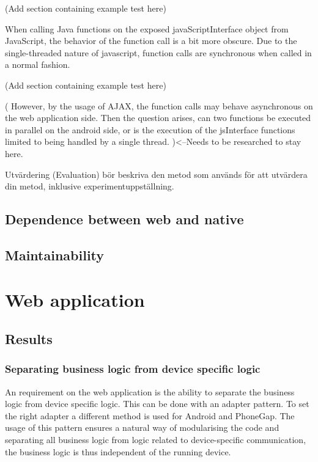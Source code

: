 (Add section containing example test here)

When calling Java functions on the exposed javaScriptInterface object from JavaScript, the behavior of the function call is a bit more obscure. Due to the single-threaded nature of javascript, function calls are synchronous when called in a normal fashion.

(Add section containing example test here)

( However, by the usage of AJAX, the function calls may behave asynchronous on the web application side. Then the question arises, can two functions be executed in parallel on the android side, or is the execution of the jsInterface functions limited to being handled by a single thread. )<--Needs to be researched to stay here.

Utvärdering (Evaluation) bör beskriva den metod som används för att utvärdera din metod, inklusive experimentuppställning.

\subsection{Dependence between web and native}

\subsection{Maintainability}

\section{Web application} 
\subsection{Results}
\subsubsection{Separating business logic from device specific logic}
An requirement on the web application is the ability to separate the business logic from device specific logic. This can be done with an adapter pattern. To set the right adapter a different method is used for Android and PhoneGap. The usage of this pattern ensures a natural way of modularising the code and separating all business logic from logic related to device-specific communication, the business logic is thus independent of the running device. 

